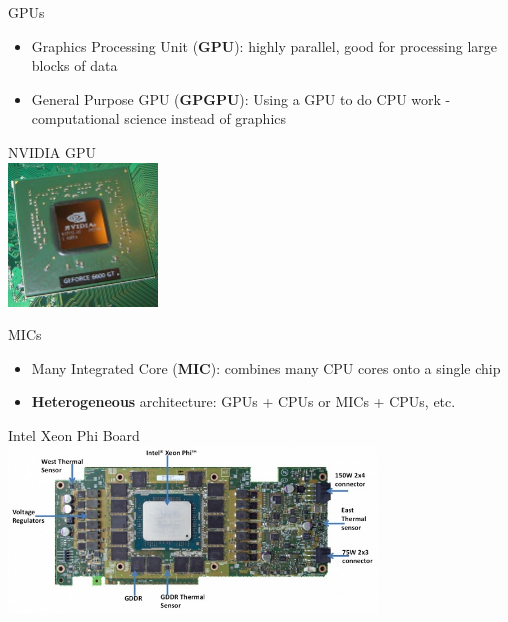 \documentclass[xcolor=x11names,compress]{beamer}
\renewcommand{\(}{\begin{columns}}
\renewcommand{\)}{\end{columns}}
\newcommand{\<}[1]{\begin{column}{#1}}
\renewcommand{\>}{\end{column}}
\begin{document}
\begin{frame}{GPUs}
\begin{itemize}
\item Graphics Processing Unit (\textbf{GPU}): highly parallel, good for processing large blocks of data
\item General Purpose GPU (\textbf{GPGPU}): Using a GPU to do CPU work - computational science instead of graphics
\end{itemize}

\begin{center}
NVIDIA GPU \\ \vspace*{1 em}
\includegraphics[height=1.5in,clip]{../figs/GPU}
\end{center}
\end{frame}

\begin{frame}{MICs}
\begin{itemize}
\item  Many Integrated Core (\textbf{MIC}): combines many CPU cores onto a single chip
\item \textbf{Heterogeneous} architecture: GPUs + CPUs or MICs + CPUs, etc.
\end{itemize}

\begin{center}
Intel Xeon Phi Board\\ \vspace*{1 em}
\includegraphics[height=1.75in,clip]{../figs/Intel-Xeon-Phi-Board}
\end{center}
\end{frame}
\end{document}
